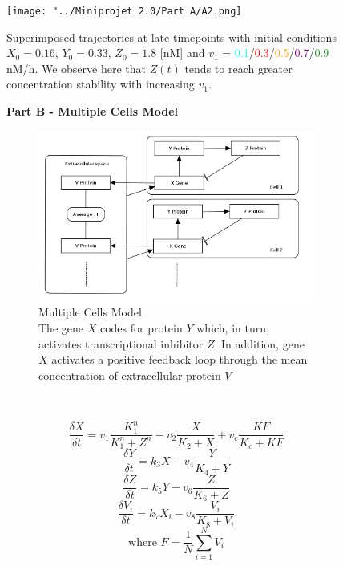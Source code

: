 \documentclass[10pt,a4paper,oneside,twocolumn]{article}
\newcommand{\red}[1]{\textcolor{red}{#1}}
\newcommand{\cyan}[1]{\textcolor{cyan}{#1}}
\newcommand{\orange}[1]{\textcolor{orange}{#1}}
\newcommand{\purple}[1]{\textcolor{purple}{#1}}
\newcommand{\fgreen}[1]{\textcolor{forestgreen}{#1}}
\numberwithin{equation}{section} %
\begin{document}
    \begin{figure}
	\centering
	    \texttt{[image: "../Miniprojet 2.0/Part A/A2.png]}
	    \caption{Superimposed trajectories at late timepoints with initial conditions $X_0 = 0.16$, $Y_0 = 0.33 $, $Z_0 = 1.8$ [nM] and $v_1$ = \cyan{0.1}/\red{0.3}/\orange{0.5}/\purple{0.7}/\fgreen{0.9} nM/h. We observe here that $Z(t)$ tends to reach greater concentration stability with increasing $v_1$.
	    }
    \end{figure}

    \begin{figure}[!htb] 		%
	\captionsetup{labelformat=empty}
	\caption{\Huge{\textbf{Part B - Multiple Cells Model}}}
    \end{figure}

    \begin{figure}[!h]
	\begin{subfigure}[b]{0.5\textwidth}
	    \includegraphics[width=\textwidth]{sketch2.png}
	    \caption{
		Multiple Cells Model\\
	    The gene $X$ codes for protein $Y$ which, in turn, activates transcriptional inhibitor $Z$. In addition, gene $X$ activates a positive feedback loop through the mean concentration of extracellular protein $V$
	    }
	\end{subfigure}
	~
	\begin{subfigure}[b]{0.5\textwidth}
	    \begin{equation*}\frac{\delta X}{\delta t} = v_1 \frac{K_1^n}{K_1^n + Z^n} - v_2 \frac{X}{K_2 + X} + v_c\frac{KF}{K_c + KF}\end{equation*}
	    \begin{equation*}\frac{\delta Y}{\delta t} = k_3 X - v_4 \frac{Y}{K_4 + Y}\end{equation*}
	    \begin{equation*}\frac{\delta Z}{\delta t} = k_5 Y - v_6 \frac{Z}{K_6 + Z}\end{equation*}
	    \begin{equation*}\frac{\delta V_i}{\delta t} = k_7 X_i - v_8 \frac{V_i}{K_8 + V_i}\end{equation*}
	    \begin{equation*}\text{where } F = \frac{1}{N}\sum_{i=1}^{N}V_i\end{equation*}


\end{subfigure}
\end{figure}
\end{document}
